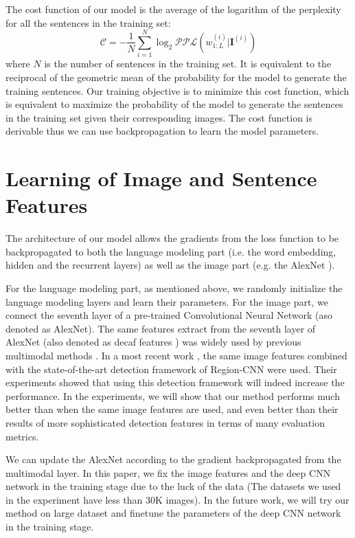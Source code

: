 The cost function of our model is the average of the logarithm of the perplexity for all the sentences in the training set:
\begin{equation}
\mathcal{C} = -\frac{1}{N} \sum_{i=1}^{N} \log_2 \mathcal{PPL}(w_{1:L}^{(i)}|\mathbf{I}^{(i)})
\end{equation}
where $N$ is the number of sentences in the training set.
It is equivalent to the reciprocal of the geometric mean of the probability for the model to generate the training sentences.
Our training objective is to minimize this cost function, which is equivalent to maximize the probability of the model to generate the sentences in the training set given their corresponding images.
The cost function is derivable thus we can use backpropagation to learn the model parameters.

\section{Learning of Image and Sentence Features}
\label{sec:ImgSenFeat}

The architecture of our model allows the gradients from the loss function to be backpropagated to both the language modeling part (i.e. the word embedding, hidden and the recurrent layers) as well as the image part (e.g. the AlexNet \cite{krizhevsky2012imagenet}).

For the language modeling part, as mentioned above, we randomly initialize the language modeling layers and learn their parameters. For the image part, we connect the seventh layer of a pre-trained Convolutional Neural Network \cite{krizhevsky2012imagenet,donahue2013decaf} (aso denoted as AlexNet).
The same features extract from the seventh layer of AlexNet (also denoted as decaf features \cite{donahue2013decaf}) was widely used by previous multimodal methods \cite{kiros2013multimodal,frome2013devise,karpathy2014fragment,socher2014grounded}.
In a most recent work \cite{karpathy2014fragment}, the same image features combined with the state-of-the-art detection framework of Region-CNN \cite{girshick2014rcnn} were used.
Their experiments showed that using this detection framework will indeed increase the performance.
In the experiments, we will show that our method performs much better than \cite{karpathy2014fragment} when the same image features are used, and even better than their results of more sophisticated detection features in terms of many evaluation metrics.

We can update the AlexNet according to the gradient backpropagated from the multimodal layer. In this paper, we fix the image features and the deep CNN network in the training stage due to the luck of the data (The datasets we used in the experiment have less than 30K images).
In the future work, we will try our method on large dataset and finetune the parameters of the deep CNN network in the training stage.

